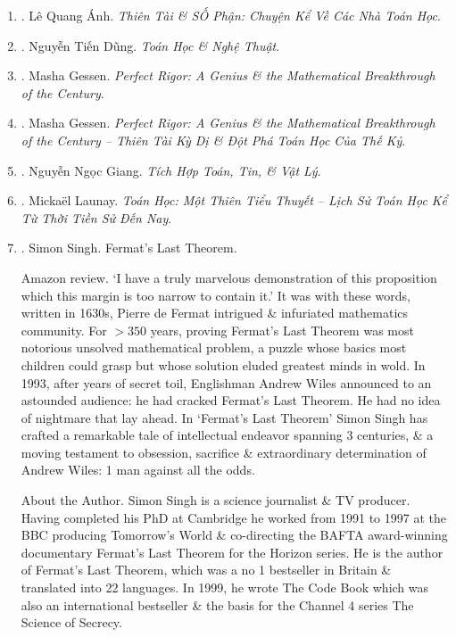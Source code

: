 \documentclass{article}
\begin{document}
\begin{enumerate}
	\item \cite{Anh_genius}. {\sc Lê Quang Ánh}. {\it Thiên Tài \& SỐ Phận: Chuyện Kể Về Các Nhà Toán Học}.\hfill{\sf[done]}

	\item \cite{Dung_math_art}. {\sc Nguyễn Tiến Dũng}. {\it Toán Học \& Nghệ Thuật}.\hfill{\sf[done]}

	\item \cite{Gessen2009}. {\sc Masha Gessen}. {\it Perfect Rigor: A Genius \& the Mathematical Breakthrough of the Century}.\hfill{\sf[done]}

	\item \cite{Gessen2022}. {\sc Masha Gessen}. {\it Perfect Rigor: A Genius \& the Mathematical Breakthrough of the Century -- Thiên Tài Kỳ Dị \& Đột Phá Toán Học Của Thế Kỷ}.\hfill{\sf[reading]}

	\item \cite{Giang_tich_hop_Toan_Tin_Ly}. {\sc Nguyễn Ngọc Giang}. {\it Tích Hợp Toán, Tin, \& Vật Lý}.\hfill{\sf[reading]}

	\item \cite{Launay2022}. {\sc Micka\"el Launay}. {\it Toán Học: Một Thiên Tiểu Thuyết -- Lịch Sử Toán Học Kể Từ Thời Tiền Sử Đến Nay}.\hfill{\sf[done]}

	\item \cite{Singh_last_Fermat_thm}. {\sc Simon Singh}. {Fermat's Last Theorem}. {}

	{\sf Amazon review.} `I have a truly marvelous demonstration of this proposition which this margin is too narrow to contain it.' It was with these words, written in 1630s, {\sc Pierre de Fermat} intrigued \& infuriated mathematics community. For $> 350$ years, proving Fermat's Last Theorem was most notorious unsolved mathematical problem, a puzzle whose basics most children could grasp but whose solution eluded greatest minds in wold. In 1993, after years of secret toil, Englishman {\sc Andrew Wiles} announced to an astounded audience: he had cracked Fermat's Last Theorem. He had no idea of nightmare that lay ahead. In `Fermat's Last Theorem' {\sc Simon Singh} has crafted a remarkable tale of intellectual endeavor spanning 3 centuries, \& a moving testament to obsession, sacrifice \& extraordinary determination of {\sc Andrew Wiles}: 1 man against all the odds.

	{\sf About the Author.} {\sc Simon Singh} is a science journalist \& TV producer. Having completed his PhD at Cambridge he worked from 1991 to 1997 at the BBC producing Tomorrow's World \& co-directing the BAFTA award-winning documentary Fermat's Last Theorem for the Horizon series. He is the author of Fermat's Last Theorem, which was a no 1 bestseller in Britain \& translated into 22 languages. In 1999, he wrote The Code Book which was also an international bestseller \& the basis for the Channel 4 series The Science of Secrecy.


\end{enumerate}
\end{document}
